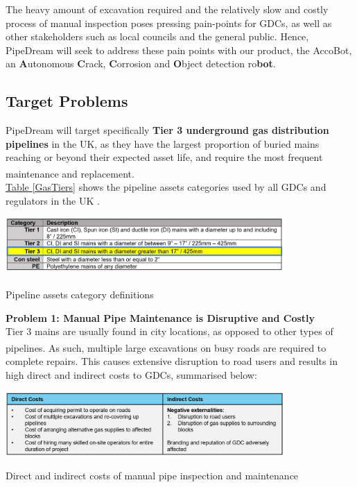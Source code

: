 \documentclass[11pt]{article}		%
\newcommand{\supercite}[1]{\textsuperscript{\cite{#1}}}		%
\newcommand{\tableref}[1]{\hyperref[#1]{Table \ref*{#1}}}     %
\begin{document}
		\vspace{-0.75cm}
		The heavy amount of excavation required and the relatively slow and costly process of manual inspection poses pressing pain-points for GDCs, as well as other stakeholders such as local councils and the general public. Hence, PipeDream will seek to address these pain points with our product, the AccoBot, an \textbf{A}utonomous \textbf{C}rack, \textbf{C}orrosion and \textbf{O}bject detection ro\textbf{bot}.
		
	\subsection[Target Problems]{Target Problems}
	
	PipeDream will target specifically \textbf{Tier 3 underground gas distribution pipelines} in the UK, as they have the largest proportion of buried mains reaching or beyond their expected asset life, and require the most frequent maintenance and replacement\supercite{tier3}.\\
	
	
	\tableref{GasTiers} shows the pipeline assets categories used by all GDCs and regulators in the UK .
		\begin{table}[h]
			\centering
			\includegraphics[width=0.8\textwidth]{GasTiers}
			\caption{Pipeline assets category definitions\supercite{tier3}}
			\label{GasTiers}
 		\end{table}
 	\vspace{-0.5cm}
 	
    \textbf{Problem 1: Manual Pipe Maintenance is Disruptive and Costly}\\
    Tier 3 mains are usually found in city locations, as opposed to other types of pipelines\supercite{tier3hse}. As such, multiple large excavations on busy roads are required to complete repairs. This causes extensive disruption to road users and results in high direct and indirect costs to GDCs, summarised below:
    		\begin{table}[h]
			\centering
			\includegraphics[width=0.8\textwidth]{costs.jpg}
			\caption{Direct and indirect costs of manual pipe inspection and maintenance}
			\label{PipeInspectionCosts}
 		\end{table}
 	\vspace{-0.5cm}
    
\end{document}
